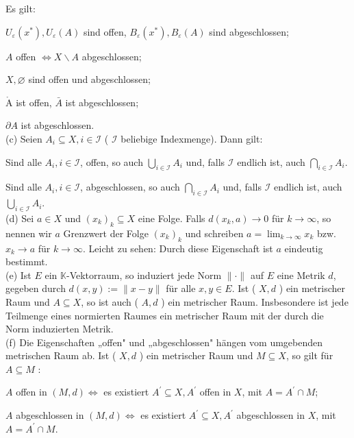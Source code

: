 \documentclass[10pt, letterpaper]{article}
\def\AA{\mathring{\mathrm{A}}}
\begin{document}
Es gilt:


$U_{\varepsilon}\left(x^{*}\right), U_{\varepsilon}(A)$ sind offen, $B_{\varepsilon}\left(x^{*}\right), B_{\varepsilon}(A)$ sind abgeschlossen;

$A$ offen $\Longleftrightarrow X \backslash A$ abgeschlossen;

$X, \varnothing$ sind offen und abgeschlossen;

$\AA$ ist offen, $\bar{A}$ ist abgeschlossen;

$\partial A$ ist abgeschlossen.\\

(c) Seien $A_{i} \subseteq X, i \in \mathcal{I}$ ( $\mathcal{I}$ beliebige Indexmenge). Dann gilt:
  
  Sind alle $A_{i}, i \in \mathcal{I}$, offen, so auch $\bigcup_{i \in \mathcal{I}} A_{i}$ und, falls $\mathcal{I}$ endlich ist, auch $\bigcap_{i \in \mathcal{I}} A_{i}$.
  
  Sind alle $A_{i}, i \in \mathcal{I}$, abgeschlossen, so auch $\bigcap_{i \in \mathcal{I}} A_{i}$ und, falls $\mathcal{I}$ endlich ist, auch $\bigcup_{i \in \mathcal{I}} A_{i}$.\\
(d) Sei $a \in X$ und $\left(x_{k}\right)_{k} \subseteq X$ eine Folge. Falls $d\left(x_{k}, a\right) \rightarrow 0$ für $k \rightarrow \infty$, so nennen wir $a$ Grenzwert der Folge $\left(x_{k}\right)_{k}$ und schreiben $a=\lim _{k \rightarrow \infty} x_{k}$ bzw. $x_{k} \rightarrow a$ für $k \rightarrow \infty$. Leicht zu sehen: Durch diese Eigenschaft ist $a$ eindeutig bestimmt.\\
(e) Ist $E$ ein $\mathbb{K}$-Vektorraum, so induziert jede Norm $\|\cdot\|$ auf $E$ eine Metrik $d$, gegeben durch $d(x, y):=\|x-y\|$ für alle $x, y \in E$. Ist ( $X, d$ ) ein metrischer Raum und $A \subseteq X$, so ist auch ( $A, d$ ) ein metrischer Raum. Insbesondere ist jede Teilmenge eines normierten Raumes ein metrischer Raum mit der durch die Norm induzierten Metrik.\\

(f) Die Eigenschaften „offen" und „abgeschlossen" hängen vom umgebenden metrischen Raum ab. Ist ( $X, d$ ) ein metrischer Raum und $M \subseteq X$, so gilt für $A \subseteq M$ :
  
   $A$ offen in $(M, d) \Longleftrightarrow$ es existiert $A^{\prime} \subseteq X, A^{\prime}$ offen in $X$, mit $A=A^{\prime} \cap M$;
  
   $A$ abgeschlossen in $(M, d) \Longleftrightarrow$ es existiert $A^{\prime} \subseteq X, A^{\prime}$ abgeschlossen in $X$, mit $A=A^{\prime} \cap M$.\\
\end{document}
